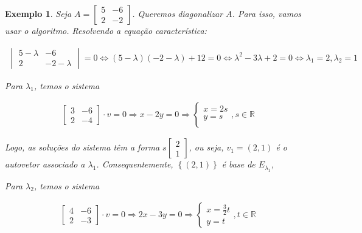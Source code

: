 \documentclass{article}
\newtheorem*{example}{Exemplo}
\begin{document}
\begin{example}
	Seja $A = \begin{bmatrix}
	5 & -6 \\
	2 & -2
	\end{bmatrix}$. Queremos diagonalizar $A$. Para isso, vamos usar o algoritmo. Resolvendo a equação característica:
	
	\begin{align*}
	\begin{vmatrix}
	5 - \lambda & -6 \\
	2 & -2-\lambda
	\end{vmatrix} = 0 \Leftrightarrow (5-\lambda)(-2-\lambda) + 12 = 0 \Leftrightarrow \lambda^2 - 3\lambda + 2 = 0 \Leftrightarrow \lambda_1 = 2, \lambda_2 = 1
	\end{align*}
	
	\par\vspace{0.3cm} Para $\lambda_1$, temos o sistema
	
	\begin{align*}
	\begin{bmatrix}
	3 & -6 \\
	2 & -4
	\end{bmatrix}\cdot v = 0 \Rightarrow x - 2y = 0 \Rightarrow \begin{cases}
	x = 2s \\
	y = s \\
	\end{cases}, s\in\mathbb{R}
	\end{align*}
	
	\par\vspace{0.3cm} Logo, as soluções do sistema têm a forma $s\begin{bmatrix}
	2\\
	1
	\end{bmatrix}$, ou seja, $v_1 = (2,1)$ é o autovetor associado a $\lambda_1$. Consequentemente, $\left\{ (2, 1) \right\}$ é base de $E_{\lambda_1}$,
	
	\par\vspace{0.3cm} Para $\lambda_2$, temos o sistema
	
	\begin{align*}
	\begin{bmatrix}
	4 & -6\\
	2 & -3
	\end{bmatrix}\cdot v = 0 \Rightarrow 2x - 3y = 0 \Rightarrow\begin{cases}
	x = \displaystyle{ \frac{3}{2}t } \\
	y =  t
	\end{cases}, t\in\mathbb{R}
	\end{align*}
	

\end{example}
\end{document}
